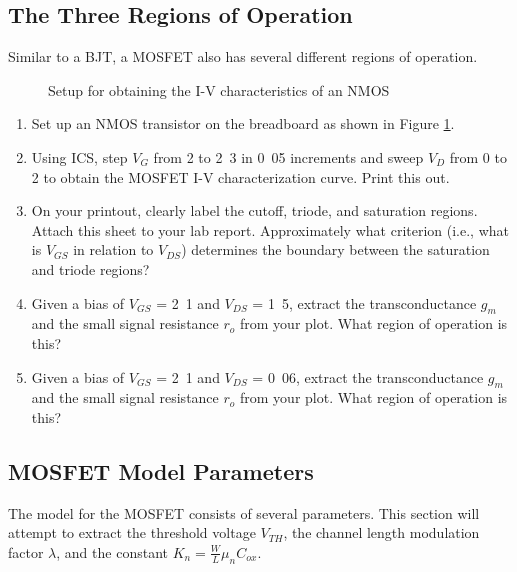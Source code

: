 \documentclass{article}
\begin{document}
\subsection{The Three Regions of Operation}
Similar to a BJT, a MOSFET also has several different regions of operation.

	\begin{figure}[!htb]
		
		\centerline{\box\graph}
		\caption{Setup for obtaining the I-V characteristics of an NMOS}
		\label{operation}
	\end{figure}

\begin{enumerate}
	\item Set up an NMOS transistor on the breadboard as shown in Figure \ref{operation}.
	\item Using ICS, step $V_{G}$ from \unit{2}{\volt} to \unit{2.3}{\volt} in \unit{0.05}{\volt} increments and sweep $V_{D}$ from \unit{0}{\volt} to \unit{2}{\volt} to obtain the MOSFET I-V characterization curve. Print this out.
	\item On your printout, clearly label the cutoff, triode, and saturation regions. Attach this sheet to your lab report. Approximately what criterion (i.e., what is $V_{GS}$ in relation to $V_{DS}$) determines the boundary between the saturation and triode regions?
	\item Given a bias of $V_{GS}$ = \unit{2.1}{\volt} and $V_{DS}$ = \unit{1.5}{\volt}, extract the transconductance $g_m$ and the small signal resistance $r_o$ from your plot. What region of operation is this?
	\item Given a bias of $V_{GS}$ = \unit{2.1}{\volt} and $V_{DS}$ = \unit{0.06}{\volt}, extract the transconductance $g_m$ and the small signal resistance $r_o$ from your plot. What region of operation is this?
\end{enumerate}

\subsection{MOSFET Model Parameters}
The model for the MOSFET consists of several parameters. This section will attempt to extract the threshold voltage $V_{TH}$, the channel length modulation factor $\lambda$, and the constant $K_n = \frac{W}{L} \mu_n C_{ox}$.
\end{document}
